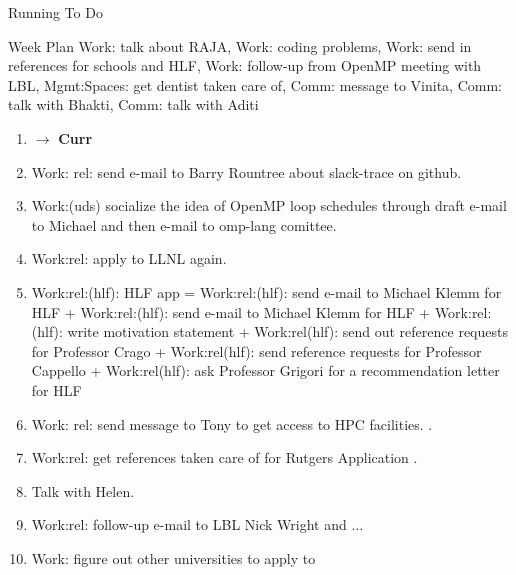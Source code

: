 \begin{frame}[allowframebreaks]{Running To Do}

\begin{block}{Week Plan}
Work: talk about RAJA, Work: coding problems, 
Work: send in references for schools and HLF,
Work: follow-up from OpenMP meeting with LBL, 
Mgmt:Spaces: get dentist taken care of, Comm: message
to Vinita, Comm: talk with Bhakti, Comm: talk with Aditi 

\end{block}

\begin{enumerate}
.   

  \item \tiny $\rightarrow$ \textbf{Curr}

\item \tiny Work: rel: send e-mail to Barry Rountree about slack-trace
  on github.   

\item \tiny Work:(uds) socialize the idea of OpenMP loop schedules through
  draft e-mail to Michael and then e-mail to omp-lang comittee. 

\item \tiny Work:rel: apply to LLNL again. 

\item \tiny Work:rel:(hlf): HLF app = Work:rel:(hlf): send e-mail to
  Michael Klemm for HLF  + Work:rel:(hlf): send e-mail to Michael Klemm
  for HLF + Work:rel:(hlf): write motivation statement +
  Work:rel(hlf): send out reference requests for Professor Crago +
  Work:rel(hlf): send reference requests for Professor Cappello +
  Work:rel(hlf): ask Professor Grigori for a recommendation letter for
  HLF 

\item \tiny Work: rel: send message to Tony to get access to HPC
  facilities.  . 

\item \tiny Work:rel: get references taken care of for Rutgers
  Application . 

\item \tiny Talk with Helen. \te{} 
\item \tiny Work:rel: follow-up e-mail to LBL Nick Wright and ... 
\item \tiny Work: figure out other universities to apply to  


\end{enumerate}
\end{frame}
